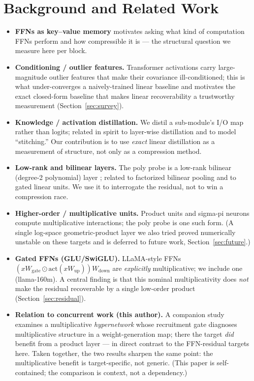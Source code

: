 \documentclass{article}
\begin{document}
\section{Background and Related Work}
\label{sec:background}

\begin{itemize}
\item \textbf{FFNs as key--value memory} \citep{geva2021kv} motivates asking what kind of
  computation FFNs perform and how compressible it is --- the structural question we measure
  here per block.
\item \textbf{Conditioning / outlier features.} Transformer activations carry
  large-magnitude outlier features \citep{dettmers2022llmint8} that make their covariance
  ill-conditioned; this is what under-converges a naively-trained linear baseline and
  motivates the exact closed-form baseline that makes linear recoverability a trustworthy
  measurement (Section~\ref{sec:survey}).
\item \textbf{Knowledge / activation distillation.} We distil a sub-module's I/O map rather
  than logits; related in spirit to layer-wise distillation and to model ``stitching.'' Our
  contribution is to use \emph{exact} linear distillation as a measurement of structure, not
  only as a compression method.
\item \textbf{Low-rank and bilinear layers.} The poly probe is a low-rank bilinear (degree-2
  polynomial) layer \citep{rendle2010fm}; related to factorized bilinear pooling and to
  gated linear units. We use it to interrogate the residual, not to win a compression race.
\item \textbf{Higher-order / multiplicative units.} Product units and sigma-pi neurons
  \citep{rumelhart1986pdp, shin1991pisigma, jayakumar2020multiplicative} compute
  multiplicative interactions; the poly probe is one such form. (A single log-space
  geometric-product layer we also tried proved numerically unstable on these targets and is
  deferred to future work, Section~\ref{sec:future}.)
\item \textbf{Gated FFNs (GLU/SwiGLU).} LLaMA-style FFNs
  $(xW_{\mathrm{gate}}\odot \mathrm{act}(xW_{\mathrm{up}}))W_{\mathrm{down}}$
  \citep{shazeer2020glu} are \emph{explicitly} multiplicative; we include one (llama-160m). A
  central finding is that this nominal multiplicativity does \emph{not} make the residual
  recoverable by a single low-order product (Section~\ref{sec:residual}).
\item \textbf{Relation to concurrent work (this author).} A companion study
  \citep{whipp2026pi} examines a multiplicative \emph{hypernetwork} whose recruitment gate
  diagnoses multiplicative structure in a weight-generation map; there the target \emph{did}
  benefit from a product layer --- in direct contrast to the FFN-residual targets here. Taken
  together, the two results sharpen the same point: the multiplicative benefit is
  target-specific, not generic. (This paper is self-contained; the comparison is context,
  not a dependency.)
\end{itemize}
\end{document}
